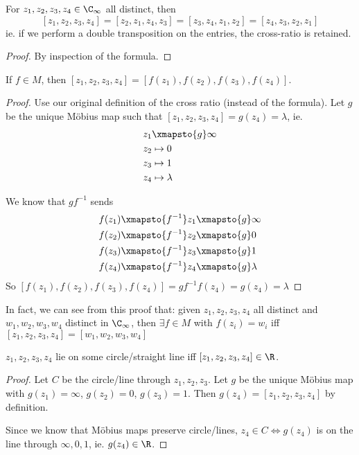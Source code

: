 \documentclass[a4paper]{article}
\begin{document}
  \begin{lemma}
    For $z_1, z_2, z_3, z_4\in \C_\infty$ all distinct, then
    \[
      [z_1, z_2, z_3, z_4] = [z_2, z_1, z_4, z_3] = [z_3, z_4, z_1, z_2] = [z_4, z_3, z_2, z_1]
    \]
    ie. if we perform a double transposition on the entries, the cross-ratio is retained.
  \end{lemma}

  \begin{proof}
    By inspection of the formula.
  \end{proof}

  \begin{prop}
    If $f\in M$, then $[z_1, z_2, z_3, z_4] = [f(z_1), f(z_2), f(z_3), f(z_4)]$.
  \end{prop}

  \begin{proof}
    Use our original definition of the cross ratio (instead of the formula). Let $g$ be the unique M\"obius map such that $[z_1, z_2, z_3, z_4] = g(z_4) = \lambda$, ie.
    \begin{align*}
      z_1 &\xmapsto{g} \infty\\
      z_2 &\mapsto 0\\
      z_3 &\mapsto 1\\
      z_4 &\mapsto \lambda
    \end{align*}

    We know that $gf^{-1}$ sends
    \begin{align*}
      f(z_1)\xmapsto{f^{-1}} z_1 &\xmapsto{g} \infty\\
      f(z_2)\xmapsto{f^{-1}} z_2 &\xmapsto{g} 0\\
      f(z_3)\xmapsto{f^{-1}} z_3 &\xmapsto{g} 1\\
      f(z_4)\xmapsto{f^{-1}} z_4 &\xmapsto{g} \lambda
    \end{align*}
    So $[f(z_1), f(z_2), f(z_3), f(z_4)] = gf^{-1}f(z_4) = g(z_4) = \lambda$
  \end{proof}

  In fact, we can see from this proof that: given $z_1, z_2, z_3, z_4$ all distinct and $w_1, w_2, w_3, w_4$ distinct in $\C_\infty$, then $\exists f\in M$ with $f(z_i) = w_i$ iff $[z_1, z_2, z_3, z_4] = [w_1, w_2, w_3, w_4]$

  \begin{cor}
    $z_1, z_2, z_3, z_4$ lie on some circle/straight line iff $[z_1, z_2, z_3, z_4]\in \R$.
  \end{cor}

  \begin{proof}
    Let $C$ be the circle/line through $z_1, z_2, z_3$. Let $g$ be the unique M\"obius map with $g(z_1) = \infty$, $g(z_2) = 0$, $g(z_3) = 1$. Then $g(z_4) = [z_1, z_2, z_3, z_4]$ by definition.

    Since we know that M\"obius maps preserve circle/lines, $z_4\in C \Leftrightarrow g(z_4)$ is on the line through $\infty, 0, 1$, ie. $g(z_4) \in \R$.
  \end{proof}
\end{document}
